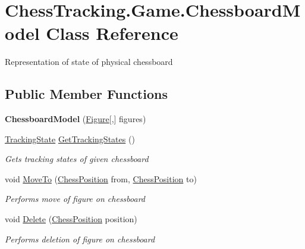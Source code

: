 \hypertarget{class_chess_tracking_1_1_game_1_1_chessboard_model}{}\section{Chess\+Tracking.\+Game.\+Chessboard\+Model Class Reference}
\label{class_chess_tracking_1_1_game_1_1_chessboard_model}


Representation of state of physical chessboard  


\subsection*{Public Member Functions}
\begin{DoxyCompactItemize}
\item 
\mbox{\label{class_chess_tracking_1_1_game_1_1_chessboard_model_af15317d4e3a6a2553d7e39835d7af6aa}} 
{\bfseries Chessboard\+Model} (\mbox{\hyperlink{class_chess_tracking_1_1_game_1_1_figure}{Figure}}\mbox{[},\mbox{]} figures)
\item 
\mbox{\hyperlink{class_chess_tracking_1_1_multithreading_messages_1_1_tracking_state}{Tracking\+State}} \mbox{\hyperlink{class_chess_tracking_1_1_game_1_1_chessboard_model_a7dba1550cc252450505f388ad10ebffd}{Get\+Tracking\+States}} ()
\begin{DoxyCompactList}\small\item\em Gets tracking states of given chessboard \end{DoxyCompactList}\item 
void \mbox{\hyperlink{class_chess_tracking_1_1_game_1_1_chessboard_model_a86d722a1525231eb7133323b7bf021c5}{Move\+To}} (\mbox{\hyperlink{class_chess_tracking_1_1_game_1_1_chess_position}{Chess\+Position}} from, \mbox{\hyperlink{class_chess_tracking_1_1_game_1_1_chess_position}{Chess\+Position}} to)
\begin{DoxyCompactList}\small\item\em Performs move of figure on chessboard \end{DoxyCompactList}\item 
void \mbox{\hyperlink{class_chess_tracking_1_1_game_1_1_chessboard_model_a81d023f3491a9d0c41ac971c8ac5b86d}{Delete}} (\mbox{\hyperlink{class_chess_tracking_1_1_game_1_1_chess_position}{Chess\+Position}} position)
\begin{DoxyCompactList}\small\item\em Performs deletion of figure on chessboard \end{DoxyCompactList}\item 

\end{DoxyCompactItemize}
